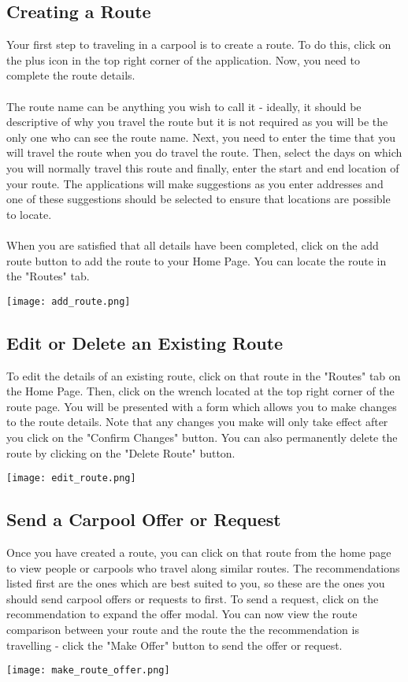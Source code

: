 \documentclass[12pt]{article}
\begin{document}
\subsection{Creating a Route}
Your first step to traveling in a carpool is to create a route. To do this, click on the plus icon in the top right corner of the application. Now, you need to complete the route details. 
\\
\\
The route name can be anything you wish to call it - ideally, it should be descriptive of why you travel the route but it is not required as you will be the only one who can see the route name. Next, you need to enter the time that you will travel the route when you do travel the route. Then, select the days on which you will normally travel this route and finally, enter the start and end location of your route. The applications will make suggestions as you enter addresses and one of these suggestions should be selected to ensure that locations are possible to locate. 
\\
\\
When you are satisfied that all details have been completed, click on the add route button to add the route to your Home Page. You can locate the route in the "Routes" tab.
\begin{center}
\texttt{[image: add\_route.png]}
\end{center}

\subsection{Edit or Delete an Existing Route}
To edit the details of an existing route, click on that route in the "Routes" tab on the Home Page. Then, click on the wrench located at the top right corner of the route page. You will be presented with a form which allows you to make changes to the route details. Note that any changes you make will only take effect after you click on the "Confirm Changes" button. You can also permanently delete the route by clicking on the "Delete Route" button.
\begin{center}
\texttt{[image: edit\_route.png]}
\end{center}

\subsection{Send a Carpool Offer or Request}
Once you have created a route, you can click on that route from the home page to view people or carpools who travel along similar routes. The recommendations listed first are the ones which are best suited to you, so these are the ones you should send carpool offers or requests to first. To send a request, click on the recommendation to expand the offer modal. You can now view the route comparison between your route and the route the the recommendation is travelling - click the "Make Offer" button to send the offer or request.
\begin{center}
\texttt{[image: make\_route\_offer.png]}
\end{center}
\end{document}
